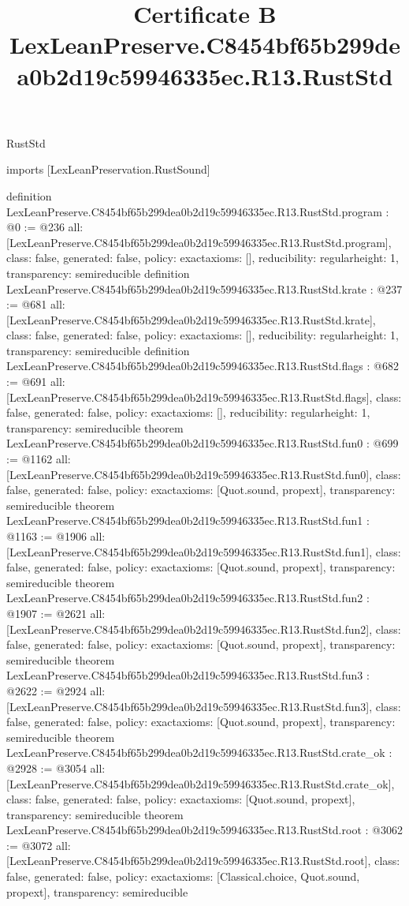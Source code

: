 \begin{lexlean}{RustStd}
\title{Certificate B LexLeanPreserve.C8454bf65b299dea0b2d19c59946335ec.R13.RustStd}
\begin{coremodule}
imports [LexLeanPreservation.RustSound]

definition LexLeanPreserve.C8454bf65b299dea0b2d19c59946335ec.R13.RustStd.program : @0 := @236 {
  all: [LexLeanPreserve.C8454bf65b299dea0b2d19c59946335ec.R13.RustStd.program],
  class: false,
  generated: false,
  policy: exact{axioms: []},
  reducibility: regular{height: 1},
  transparency: semireducible
}
definition LexLeanPreserve.C8454bf65b299dea0b2d19c59946335ec.R13.RustStd.krate : @237 := @681 {
  all: [LexLeanPreserve.C8454bf65b299dea0b2d19c59946335ec.R13.RustStd.krate],
  class: false,
  generated: false,
  policy: exact{axioms: []},
  reducibility: regular{height: 1},
  transparency: semireducible
}
definition LexLeanPreserve.C8454bf65b299dea0b2d19c59946335ec.R13.RustStd.flags : @682 := @691 {
  all: [LexLeanPreserve.C8454bf65b299dea0b2d19c59946335ec.R13.RustStd.flags],
  class: false,
  generated: false,
  policy: exact{axioms: []},
  reducibility: regular{height: 1},
  transparency: semireducible
}
theorem LexLeanPreserve.C8454bf65b299dea0b2d19c59946335ec.R13.RustStd.fun0 : @699 := @1162 {
  all: [LexLeanPreserve.C8454bf65b299dea0b2d19c59946335ec.R13.RustStd.fun0],
  class: false,
  generated: false,
  policy: exact{axioms: [Quot.sound, propext]},
  transparency: semireducible
}
theorem LexLeanPreserve.C8454bf65b299dea0b2d19c59946335ec.R13.RustStd.fun1 : @1163 := @1906 {
  all: [LexLeanPreserve.C8454bf65b299dea0b2d19c59946335ec.R13.RustStd.fun1],
  class: false,
  generated: false,
  policy: exact{axioms: [Quot.sound, propext]},
  transparency: semireducible
}
theorem LexLeanPreserve.C8454bf65b299dea0b2d19c59946335ec.R13.RustStd.fun2 : @1907 := @2621 {
  all: [LexLeanPreserve.C8454bf65b299dea0b2d19c59946335ec.R13.RustStd.fun2],
  class: false,
  generated: false,
  policy: exact{axioms: [Quot.sound, propext]},
  transparency: semireducible
}
theorem LexLeanPreserve.C8454bf65b299dea0b2d19c59946335ec.R13.RustStd.fun3 : @2622 := @2924 {
  all: [LexLeanPreserve.C8454bf65b299dea0b2d19c59946335ec.R13.RustStd.fun3],
  class: false,
  generated: false,
  policy: exact{axioms: [Quot.sound, propext]},
  transparency: semireducible
}
theorem LexLeanPreserve.C8454bf65b299dea0b2d19c59946335ec.R13.RustStd.crate_ok : @2928 := @3054 {
  all: [LexLeanPreserve.C8454bf65b299dea0b2d19c59946335ec.R13.RustStd.crate_ok],
  class: false,
  generated: false,
  policy: exact{axioms: [Quot.sound, propext]},
  transparency: semireducible
}
theorem LexLeanPreserve.C8454bf65b299dea0b2d19c59946335ec.R13.RustStd.root : @3062 := @3072 {
  all: [LexLeanPreserve.C8454bf65b299dea0b2d19c59946335ec.R13.RustStd.root],
  class: false,
  generated: false,
  policy: exact{axioms: [Classical.choice, Quot.sound, propext]},
  transparency: semireducible
}


\end{coremodule}
\end{lexlean}

